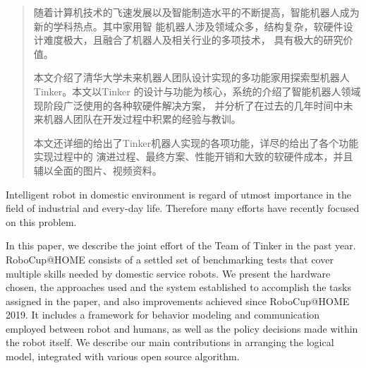 

\begin{abstract}

  随着计算机技术的飞速发展以及智能制造水平的不断提高，智能机器人成为新的学科热点。其中家用智
  能机器人涉及领域众多，结构复杂，软硬件设计难度极大，且融合了机器人及相关行业的多项技术，
  具有极大的研究价值。
  
  本文介绍了清华大学未来机器人团队设计实现的多功能家用探索型机器人Tinker。本文以Tinker
  的设计与功能为核心，系统的介绍了智能机器人领域现阶段广泛使用的各种软硬件解决方案，
  并分析了在过去的几年时间中未来机器人团队在开发过程中积累的经验与教训。
  
  本文还详细的给出了Tinker机器人实现的各项功能，详尽的给出了各个功能实现过程中的
  演进过程、最终方案、性能开销和大致的软硬件成本，并且辅以全面的图片、视频资料。
  
\end{abstract}

\begin{abstract*}

  Intelligent robot in domestic environment is regard of utmost importance in the field of
  industrial and every-day life. Therefore many efforts have recently focused on
  this problem.

  In this paper, we describe the joint effort of the Team of Tinker in the past
  year. RoboCup@HOME consists of a settled set of benchmarking tests that cover multiple
  skills needed by domestic service robots. We present the hardware chosen, the approaches
  used and the system established to accomplish the tasks assigned in the paper, and also
  improvements achieved since RoboCup@HOME 2019. It includes a framework for behavior
  modeling and communication employed between robot and humans, as well as the policy
  decisions made within the robot itself. We describe our main contributions in arranging
  the logical model, integrated with various open source algorithm.

\end{abstract*}
